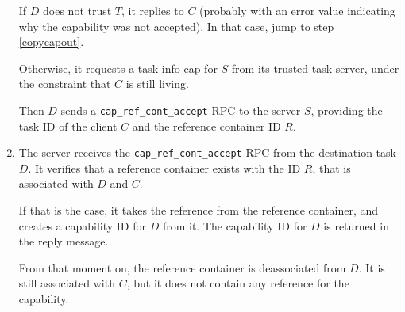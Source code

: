 \begin{enumerate}
  If $D$ does not trust $T$, it replies to $C$ (probably with an error
  value indicating why the capability was not accepted).  In that
  case, jump to step \ref{copycapout}.
  
  Otherwise, it requests a task info cap for $S$ from its trusted task
  server, under the constraint that $C$ is still living.
  
  Then $D$ sends a \verb/cap_ref_cont_accept/ RPC to the server $S$,
  providing the task ID of the client $C$ and the reference container
  ID $R$.

\begin{comment}
  \verb/cap_ref_cont_accept/ is one of the few interfaces that is not
  sent to a (real) capability, of course.  Nevertheless, it is part of
  the capability object interface, hence the name.  You can think of
  it as a static member in the capability class, that does not require
  an instance of the class.
\end{comment}
  
\item The server receives the \verb/cap_ref_cont_accept/ RPC from the
  destination task $D$.  It verifies that a reference container exists
  with the ID $R$, that is associated with $D$ and $C$.
  
  \begin{comment}
    The server will store the reference container in data structures
    associated with $C$, under an ID that is unique but local to $C$.
    So $D$ needs to provide both information, the task ID and the
    reference container ID of $C$.
  \end{comment}

  If that is the case, it takes the reference from the reference
  container, and creates a capability ID for $D$ from it.  The
  capability ID for $D$ is returned in the reply message.
  
  From that moment on, the reference container is deassociated from
  $D$.  It is still associated with $C$, but it does not contain any
  reference for the capability.

  \begin{comment}
    It is not deassociated from $C$ and removed completely, so that
    its ID $R$ (or at least the part of it that is used for $C$) is
    not reused.  $C$ must explicitely destroy the reference container
    anyway because $D$ might die unexpectedly or return an error that
    gives no indication if it accepted the reference or not.
  \end{comment}
  

\end{enumerate}
